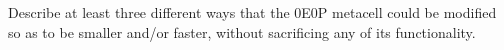 \begin{multicols}{2}
	
	\begin{problem}\label{exer:0e0p_how_make_faster} 
		Describe at least three different ways that the 0E0P metacell could be modified so as to be smaller and/or faster, without sacrificing any of its functionality.
	\end{problem}
	
	
\end{multicols}
\normalsize\vspace*{0.01cm}

